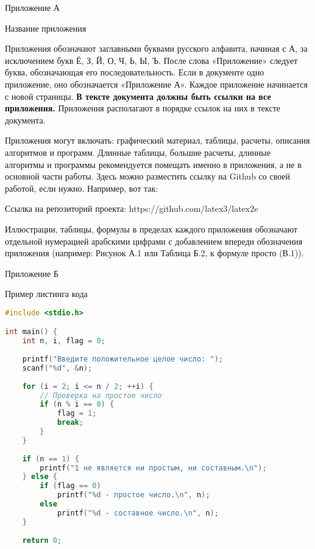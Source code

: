 \documentclass{report}
\begin{document}
\begin{flushright}
     Приложение А
\end{flushright}

\begin{center}  Название приложения \end{center}

Приложения обозначают заглавными буквами русского алфавита, начиная с А, за исключением букв Ё, З, Й, О, Ч, Ь, Ы, Ъ. После слова «Приложение» следует буква, обозначающая его последовательность.
Если в документе одно приложение, оно обозначается «Приложение А».
Каждое приложение начинается с новой страницы.
{\bf В тексте документа должны быть ссылки на все приложения.}  Приложения располагают в порядке ссылок на них в тексте документа.

Приложения могут включать: графический материал, таблицы, расчеты, описания алгоритмов и программ. Длинные таблицы, большие расчеты, длинные алгоритмы и программы рекомендуется помещать именно в приложения, а не в основной части работы. Здесь можно разместить ссылку на Github со своей работой, если нужно. Например, вот так:

Ссылка на репозиторий проекта: https://github.com/latex3/latex2e

Иллюстрации, таблицы, формулы в пределах каждого приложения обозначают отдельной нумерацией арабскими цифрами с добавлением впереди обозначения приложения (например: Рисунок А.1 или Таблица Б.2, к формуле просто (В.1)).
\newpage

\begin{flushright}
     Приложение Б
\end{flushright}

\begin{center}  Пример листинга кода \end{center}

\begin{lstlisting}[language=C, frame=single]  
#include <stdio.h>

int main() {
    int n, i, flag = 0;
    
    printf("Введите положительное целое число: ");
    scanf("%d", &n);
    
    for (i = 2; i <= n / 2; ++i) {
        // Проверка на простое число
        if (n % i == 0) {
            flag = 1;
            break;
        }
    }
    
    if (n == 1) {
        printf("1 не является ни простым, ни составным.\n");
    } else {
        if (flag == 0)
            printf("%d - простое число.\n", n);
        else
            printf("%d - составное число.\n", n);
    }
    
    return 0;
\end{lstlisting}
\newpage
\end{document}

